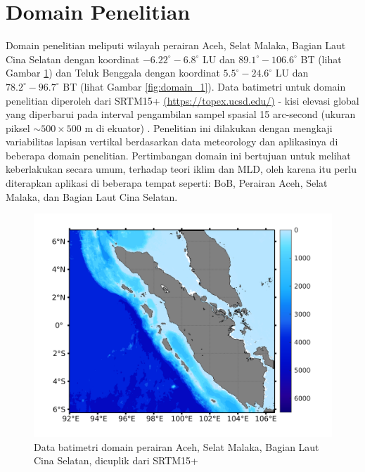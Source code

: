 \vspace{1.5pc}
\section[Domain Penelitian]{Domain Penelitian}
\begin{spacing}{1.5}
	Domain penelitian meliputi wilayah perairan Aceh, Selat Malaka, Bagian Laut Cina Selatan dengan koordinat $-6.22^\circ-6.8^\circ$ LU dan $89.1^\circ-106.6^\circ$ BT (lihat Gambar \ref{fig:domain}) dan Teluk Benggala dengan koordinat $5.5^\circ-24.6^\circ$ LU dan $78.2^\circ-96.7^\circ$ BT (lihat Gambar \ref{fig:domain_1}). Data batimetri untuk domain penelitian diperoleh dari SRTM15+ \href{https://topex.ucsd.edu/pub/archive/srtm15/V1/}{(https://topex.ucsd.edu/)} - kisi elevasi global yang diperbarui pada interval pengambilan sampel spasial 15 arc-second (ukuran piksel $\sim 500 \times 500$ m di ekuator) . Penelitian ini dilakukan dengan mengkaji variabilitas lapisan vertikal berdasarkan data meteorology dan aplikasinya di beberapa domain penelitian. Pertimbangan domain ini bertujuan untuk melihat keberlakukan secara umum, terhadap teori iklim dan MLD, oleh karena itu perlu diterapkan aplikasi di beberapa tempat seperti: BoB, Perairan Aceh, Selat Malaka, dan Bagian Laut Cina Selatan.
	\begin{figure}[H]
		\centering
		\includegraphics[width=12cm]{contents/Topo_1}
		\caption{Data batimetri domain perairan Aceh, Selat Malaka, Bagian Laut Cina Selatan, dicuplik dari SRTM15+}
		\label{fig:domain}
	\end{figure}
	\begin{figure}[H]
		\centering

\end{figure}
\end{spacing}
